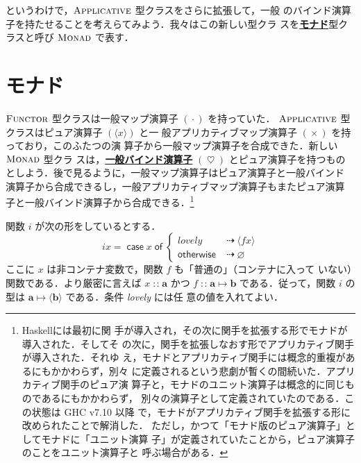 \documentclass[a5paper,twoside,fleqn,draft]{jsbook}
\newcommand{\programminglanguage}[1]{\textsf{#1}}
\newcommand{\haskell}{\programminglanguage{Haskell}}
\newcommand{\keyword}[1]{{\underline{\textbf{#1}}}}
\newcommand{\mKeyword}[1]{\mathsf{#1}} %
\newcommand{\mCaseKeyword}{\mKeyword{case}}
\newcommand{\mOfKeyword}{\mKeyword{of}}
\newcommand{\mOtherwiseKeyword}{\mKeyword{otherwise}}
\DeclareMathOperator{\mCaseKW}{\mCaseKeyword} %
\DeclareMathOperator{\mOfKW}{\mOfKeyword} %
\DeclareMathOperator{\mOtherwise}{\mOtherwiseKeyword}
\newcommand{\mPureNothing}{\varnothing}
\DeclareMathOperator{\mAppMap}{\times}
\DeclareMathOperator{\mBind}{\heartsuit}
\DeclareMathOperator{\mBindMaybe}{\spadesuit}
\DeclareMathOperator{\mIfSo}{\dashrightarrow}
\DeclareMathOperator{\mIn}{{:\!:}}
\DeclareMathOperator{\mMap}{\cdot} %
\DeclareMathOperator{\mMapsTo}{\mapsto}
\newcommand{\mType}[1]{\mathbf{#1}}
\newcommand{\mPureType}[1]{\langle\mType{#1}\rangle}
\newcommand{\mPureWith}[1]{\langle#1\rangle}
\newcommand{\mGenericTypeClass}[1]{\textsc{#1}} %
\newcommand{\mApplicativeTypeClass}{\mGenericTypeClass{Applicative}}
\newcommand{\mFunctorTypeClass}{\mGenericTypeClass{Functor}}
\newcommand{\mMonadTypeClass}{\mGenericTypeClass{Monad}}
\newcommand{\mMaybe}[1]{{#1}^?}
\newcommand{\mCaseOf}[1]{\mCaseKW#1\mOfKW}
\newcommand{\mProj}[2]{#1\mMapsTo#2}
\begin{document}

というわけで，$\mApplicativeTypeClass$ 型クラスをさらに拡張して，一般
のバインド演算子を持たせることを考えらてみよう．我々はこの新しい型クラ
スを\keyword{モナド}型クラスと呼び $\mMonadTypeClass$ で表す．

\section{モナド}

$\mFunctorTypeClass$ 型クラスは一般マップ演算子 $(\mMap)$ を持っていた．
$\mApplicativeTypeClass$ 型クラスはピュア演算子 $(\mPureWith{x})$ と一
般アプリカティブマップ演算子 $(\mAppMap)$ を持っており，このふたつの演
算子から一般マップ演算子を合成できた．新しい $\mMonadTypeClass$ 型クラ
スは，\keyword{一般バインド演算子} $(\mBind)$ とピュア演算子を持つもの
としよう．後で見るように，一般マップ演算子はピュア演算子と一般バインド
演算子から合成できるし，一般アプリカティブマップ演算子もまたピュア演算
子と一般バインド演算子から合成できる．\footnote{\haskell には最初に関
手が導入され，その次に関手を拡張する形でモナドが導入された．そしてそ
の次に，関手を拡張しなおす形でアプリカティブ関手が導入された．それゆ
え，モナドとアプリカティブ関手には概念的重複があるにもかかわらず，別々
に定義されるという悲劇が暫くの間続いた．アプリカティブ関手のピュア演
算子と，モナドのユニット演算子は概念的に同じものであるにもかかわらず，
別々の演算子として定義されていたのである．この状態は GHC v7.10 以降
で，モナドがアプリカティブ関手を拡張する形に改められたことで解消した．
ただし，かつて「モナド版のピュア演算子」としてモナドに「ユニット演算
子」が定義されていたことから，ピュア演算子のことをユニット演算子と
呼ぶ場合がある．}

関数 $i$ が次の形をしているとする．
\begin{equation}
  \label{eq:def-of-i}
  ix=\mCaseOf{x}\begin{cases}
    \textit{lovely}&\mIfSo\mPureWith{fx}\\
    \mOtherwise&\mIfSo\mPureNothing
  \end{cases}
\end{equation}
ここに $x$ は非コンテナ変数で，関数 $f$ も「普通の」（コンテナに入って
  いない）関数である．より厳密に言えば $x\mIn\mType{a}$ かつ
$f\mIn\mProj{\mType{a}}{\mType{b}}$ である．従って，関数 $i$ の型は
$\mProj{\mType{a}}{\mPureType{b}}$ である．条件 \textit{lovely} には任
意の値を入れてよい．
\end{document}
